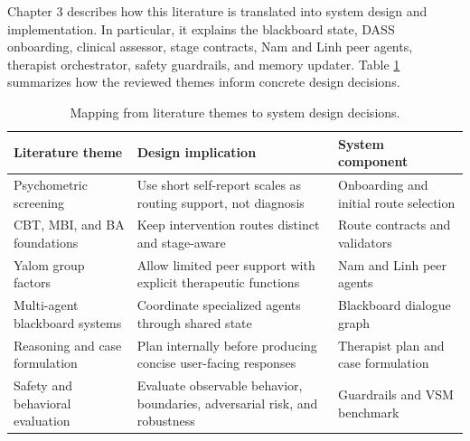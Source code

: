 Chapter 3 describes how this literature is translated into system design and implementation. In particular, it explains the blackboard state, DASS onboarding, clinical assessor, stage contracts, Nam and Linh peer agents, therapist orchestrator, safety guardrails, and memory updater. Table \ref{tab:literature_design_map} summarizes how the reviewed themes inform concrete design decisions.

\begin{table}[tb]
\centering
\caption{Mapping from literature themes to system design decisions.}
\label{tab:literature_design_map}
\small
\begin{tabular}{p{}p{}p{}}
\toprule
Literature theme & Design implication & System component \\
\midrule
Psychometric screening & Use short self-report scales as routing support, not diagnosis & Onboarding and initial route selection \\
CBT, MBI, and BA foundations & Keep intervention routes distinct and stage-aware & Route contracts and validators \\
Yalom group factors & Allow limited peer support with explicit therapeutic functions & Nam and Linh peer agents \\
Multi-agent blackboard systems & Coordinate specialized agents through shared state & Blackboard dialogue graph \\
Reasoning and case formulation & Plan internally before producing concise user-facing responses & Therapist plan and case formulation \\
Safety and behavioral evaluation & Evaluate observable behavior, boundaries, adversarial risk, and robustness & Guardrails and VSM benchmark \\
\bottomrule
\end{tabular}
\end{table}
